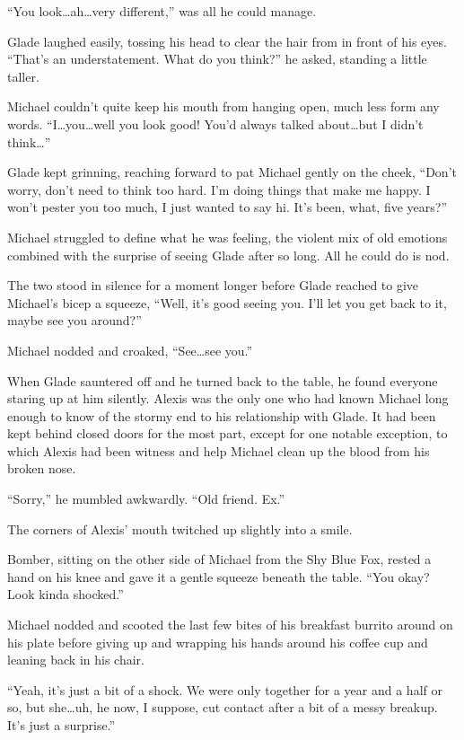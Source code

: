 ``You look\ldots{}ah\ldots{}very different,'' was all he could manage.

Glade laughed easily, tossing his head to clear the hair from in front of his eyes.  ``That's an understatement.  What do you think?'' he asked, standing a little taller.

Michael couldn't quite keep his mouth from hanging open, much less form any words.  ``I\ldots{}you\ldots{}well you look good!  You'd always talked about\ldots{}but I didn't think\ldots{}''

Glade kept grinning, reaching forward to pat Michael gently on the cheek, ``Don't worry, don't need to think too hard.  I'm doing things that make me happy.  I won't pester you too much, I just wanted to say hi.  It's been, what, five years?''

Michael struggled to define what he was feeling, the violent mix of old emotions combined with the surprise of seeing Glade after so long.  All he could do is nod.

The two stood in silence for a moment longer before Glade reached to give Michael's bicep a squeeze, ``Well, it's good seeing you.  I'll let you get back to it, maybe see you around?''

Michael nodded and croaked, ``See\ldots{}see you.''

When Glade sauntered off and he turned back to the table, he found everyone staring up at him silently. Alexis was the only one who had known Michael long enough to know of the stormy end to his relationship with Glade.  It had been kept behind closed doors for the most part, except for one notable exception, to which Alexis had been witness and help Michael clean up the blood from his broken nose.

``Sorry,'' he mumbled awkwardly.  ``Old friend.  Ex.''

The corners of Alexis' mouth twitched up slightly into a smile.

Bomber, sitting on the other side of Michael from the Shy Blue Fox, rested a hand on his knee and gave it a gentle squeeze beneath the table.  ``You okay?  Look kinda shocked.''

Michael nodded and scooted the last few bites of his breakfast burrito around on his plate before giving up and wrapping his hands around his coffee cup and leaning back in his chair.

``Yeah, it's just a bit of a shock.  We were only together for a year and a half or so, but she\ldots{}uh, he now, I suppose, cut contact after a bit of a messy breakup. It's just a surprise.''

